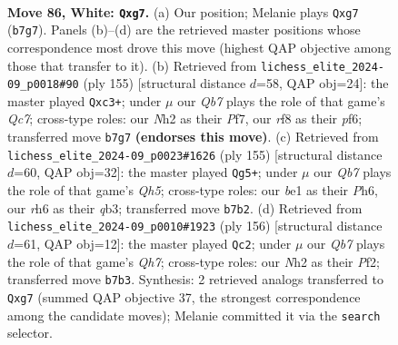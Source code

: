 \documentclass[11pt]{article}
\begin{document}
\clearpage

\begin{figure}[p]\centering
\begin{subfigure}{0.46\textwidth}\centering
\resizebox{\linewidth}{!}{%
\newchessgame
\chessboard[
  setfen={4kr2/pQ4p1/7r/q6P/3P4/4P3/7N/4b2K w - - 6 86},
  showmover=false,
  pgfstyle=straightmove, color=movearrow, markmove={b7-g7}
]}
\caption{}
\end{subfigure}\hfill
\begin{subfigure}{0.46\textwidth}\centering
\resizebox{\linewidth}{!}{%
\newchessgame
\chessboard[
  setfen={8/2k2p2/R4P2/5p2/8/2P1K3/p1q5/5Q2 b - - 19 78},
  showmover=false,
  pgfstyle=straightmove, color=movearrow, markmove={c2-c3}
]}
\caption{}
\end{subfigure}
\\[4pt]
\begin{subfigure}{0.46\textwidth}\centering
\resizebox{\linewidth}{!}{%
\newchessgame
\chessboard[
  setfen={4k3/4n3/1p5p/5p1P/P6q/1Q3B2/5P2/6K1 b - - 45 78},
  showmover=false,
  pgfstyle=straightmove, color=movearrow, markmove={h4-g5}
]}
\caption{}
\end{subfigure}\hfill
\begin{subfigure}{0.46\textwidth}\centering
\resizebox{\linewidth}{!}{%
\newchessgame
\chessboard[
  setfen={8/1kp4Q/8/3q3p/7P/1r4P1/5P1K/8 w - - 6 79},
  showmover=false,
  pgfstyle=straightmove, color=movearrow, markmove={h7-c2}
]}
\caption{}
\end{subfigure}
\caption{\textbf{Move 86, White: \texttt{Qxg7}.} (a) Our position; Melanie plays \texttt{Qxg7} (\texttt{b7g7}). Panels (b)--(d) are the retrieved master positions whose correspondence most drove this move (highest QAP objective among those that transfer to it). (b) Retrieved from \texttt{lichess\_elite\_2024-09\_p0018\#90} (ply 155) [structural distance $d$=58, QAP obj=24]: the master played \texttt{Qxc3+}; under $\mu$ our \emph{Qb7} plays the role of that game's \emph{Qc7}; cross-type roles: our \emph{N}h2 as their \emph{P}f7, our \emph{r}f8 as their \emph{p}f6; transferred move \texttt{b7g7} \textbf{(endorses this move)}. (c) Retrieved from \texttt{lichess\_elite\_2024-09\_p0023\#1626} (ply 155) [structural distance $d$=60, QAP obj=32]: the master played \texttt{Qg5+}; under $\mu$ our \emph{Qb7} plays the role of that game's \emph{Qh5}; cross-type roles: our \emph{b}e1 as their \emph{P}h6, our \emph{r}h6 as their \emph{q}b3; transferred move \texttt{b7b2}. (d) Retrieved from \texttt{lichess\_elite\_2024-09\_p0010\#1923} (ply 156) [structural distance $d$=61, QAP obj=12]: the master played \texttt{Qc2}; under $\mu$ our \emph{Qb7} plays the role of that game's \emph{Qh7}; cross-type roles: our \emph{N}h2 as their \emph{P}f2; transferred move \texttt{b7b3}. Synthesis: 2 retrieved analogs transferred to \texttt{Qxg7} (summed QAP objective 37, the strongest correspondence among the candidate moves); Melanie committed it via the \texttt{search} selector.}
\label{fig:thought-m170}
\end{figure}
\end{document}
